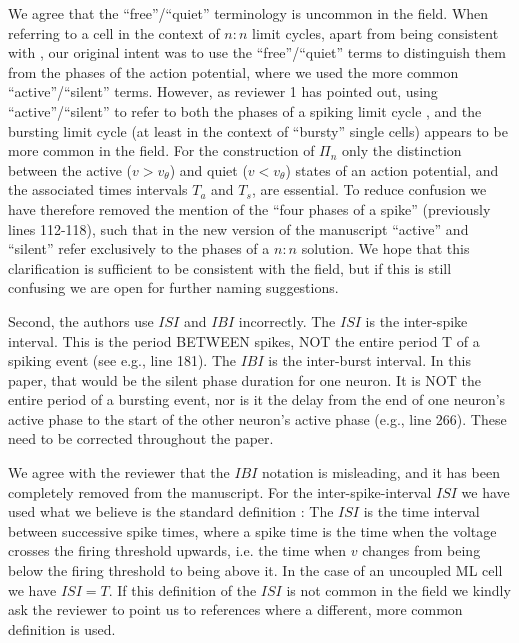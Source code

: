 \documentclass{ar2rc}
\begin{document}
\AR
We agree that the ``free''\slash``quiet'' terminology is uncommon in the field.
When referring to a cell in the context of $n:n$ limit cycles, apart from being consistent with \citet{bose2011}, our original intent was to use the ``free''\slash``quiet'' terms to distinguish them from the phases of the action potential, where we used the more common ``active''\slash ``silent'' terms.
However, as reviewer 1 has pointed out, using ``active''\slash``silent'' to refer to both the phases of a spiking limit cycle \cite[e.g.~p.~250]{ermentrout2010}, and the bursting limit cycle \cite[e.g.~p.~103]{ermentrout2010} (at least in the context of ``bursty'' single cells) appears to be more common in the field.
For the construction of $\Pi_{n}$ only the distinction between the active ($v>v_{\theta}$) and quiet ($v<v_{\theta}$) states of an action potential, and the associated times intervals $T_{a}$ and $T_{s}$, are essential.
To reduce confusion we have therefore removed the mention of the ``four phases of a spike'' (previously lines 112-118), such that in the new version of the manuscript ``active'' and ``silent'' refer exclusively to the phases of a $n:n$ solution.
We hope that this clarification is sufficient to be consistent with the field, but if this is still confusing we are open for further naming suggestions.

\RC
Second, the authors use $ISI$ and $IBI$ incorrectly. The $ISI$ is the inter-spike interval. This is the period BETWEEN spikes, NOT the entire period T of a spiking event (see e.g., line 181). The $IBI$ is the inter-burst interval. In this paper, that would be the silent phase duration for one neuron. It is NOT the entire period of a bursting event, nor is it the delay from the end of one neuron's active phase to the start of the other neuron's active phase (e.g., line 266). These need to be corrected throughout the paper.

\AR
We agree with the reviewer that the $IBI$ notation is misleading, and it has been completely removed from the manuscript. For the inter-spike-interval $ISI$ we have used what we believe is the standard definition \cite[e.g.][]{ermentrout1998,bose2011,matveev2007}: The $ISI$ is the time interval between successive spike times, where a spike time is the time when the voltage crosses the firing threshold upwards, i.e. the time when $v$ changes from being below the firing threshold to being above it. In the case of an uncoupled ML cell we have $ISI=T$. If this definition of the $ISI$ is not common in the field we kindly ask the reviewer to point us to references where a different, more common definition is used.
\end{document}
